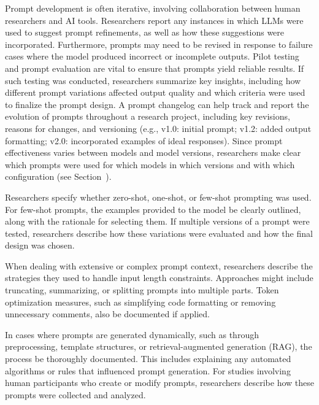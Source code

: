 Prompt development is often iterative, involving collaboration between human researchers and AI tools.
Researchers \should report any instances in which LLMs were used to suggest prompt refinements, as well as how these suggestions were incorporated.
Furthermore, prompts may need to be revised in response to failure cases where the model produced incorrect or incomplete outputs.
Pilot testing and prompt evaluation are vital to ensure that prompts yield reliable results.
If such testing was conducted, researchers \should summarize key insights, including how different prompt variations affected output quality and which criteria were used to finalize the prompt design.
A prompt changelog can help track and report the evolution of prompts throughout a research project, including key revisions, reasons for changes, and versioning (e.g., v1.0: initial prompt; v1.2: added output formatting; v2.0: incorporated examples of ideal responses).
Since prompt effectiveness varies between models and model versions, researchers \must make clear which prompts were used for which models in which versions and with which configuration (see Section~\modelversion).

Researchers \must specify whether zero-shot, one-shot, or few-shot prompting was used.
For few-shot prompts, the examples provided to the model \should be clearly outlined, along with the rationale for selecting them.
If multiple versions of a prompt were tested, researchers \should describe how these variations were evaluated and how the final design was chosen.

When dealing with extensive or complex prompt context, researchers \must describe the strategies they used to handle input length constraints.
Approaches might include truncating, summarizing, or splitting prompts into multiple parts.
Token optimization measures, such as simplifying code formatting or removing unnecessary comments, \must also be documented if applied.

In cases where prompts are generated dynamically, such as through preprocessing, template structures, or retrieval-augmented generation (RAG), the process \must be thoroughly documented.
This includes explaining any automated algorithms or rules that influenced prompt generation.
For studies involving human participants who create or modify prompts, researchers \must describe how these prompts were collected and analyzed.

